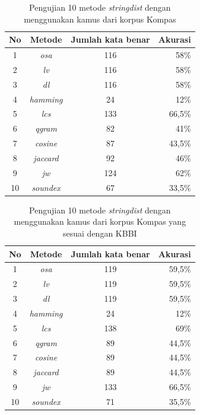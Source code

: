 \begin{table}[H]
	\captionsetup{justification=justified,singlelinecheck=false}
	\caption{Pengujian 10 metode \textit{stringdist} dengan menggunakan kamus dari korpus Kompas}
    \label{tbl:ipb_eval_2}
    \centering
	\begin{tabular}{|c|c|c|r|}
		\hline
		No & Metode & Jumlah kata benar & \multicolumn{1}{c|}{Akurasi} \\ \hline
		1 & \textit{osa} & 116 & 58\% \\
		2 & \textit{lv} & 116 & 58\% \\
		3 & \textit{dl} & 116 & 58\% \\
		4 & \textit{hamming} & 24 & 12\% \\
		5 & \textit{lcs} & 133 & 66,5\% \\
		6 & \textit{qgram} & 82 & 41\% \\
		7 & \textit{cosine} & 87 & 43,5\% \\
		8 & \textit{jaccard} & 92 & 46\% \\
		9 & \textit{jw} & 124 & 62\% \\
		10 & \textit{soundex} & 67 & 33,5\% \\ \hline
	\end{tabular}
\end{table}

\begin{table}[H]
	\captionsetup{justification=justified,singlelinecheck=false}
	\caption{Pengujian 10 metode \textit{stringdist} dengan menggunakan kamus dari korpus Kompas yang sesuai dengan KBBI}
    \label{tbl:ipb_eval_3}
    \centering
	\begin{tabular}{|c|c|c|r|}
		\hline
		No & Metode & Jumlah kata benar & \multicolumn{1}{c|}{Akurasi} \\ \hline
		1 & \textit{osa} & 119 & 59,5\% \\
		2 & \textit{lv} & 119 & 59,5\% \\
		3 & \textit{dl} & 119 & 59,5\% \\
		4 & \textit{hamming} & 24 & 12\% \\
		5 & \textit{lcs} & 138 & 69\% \\
		6 & \textit{qgram} & 89 & 44,5\% \\
		7 & \textit{cosine} & 89 & 44,5\% \\
		8 & \textit{jaccard} & 89 & 44,5\% \\
		9 & \textit{jw} & 133 & 66,5\% \\
		10 & \textit{soundex} & 71 & 35,5\% \\ \hline
	\end{tabular}
\end{table}

